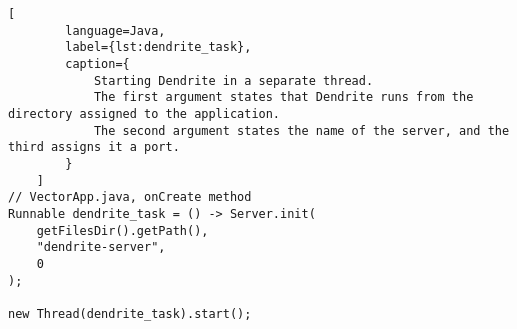 \begin{lstfloat}
    \begin{lstlisting}[
        language=Java,
        label={lst:dendrite_task},
        caption={
            Starting Dendrite in a separate thread.
            The first argument states that Dendrite runs from the directory assigned to the application.
            The second argument states the name of the server, and the third assigns it a port.
        }
    ]
// VectorApp.java, onCreate method
Runnable dendrite_task = () -> Server.init(
    getFilesDir().getPath(),
    "dendrite-server",
    0
);

new Thread(dendrite_task).start();
\end{lstlisting}
\end{lstfloat}

